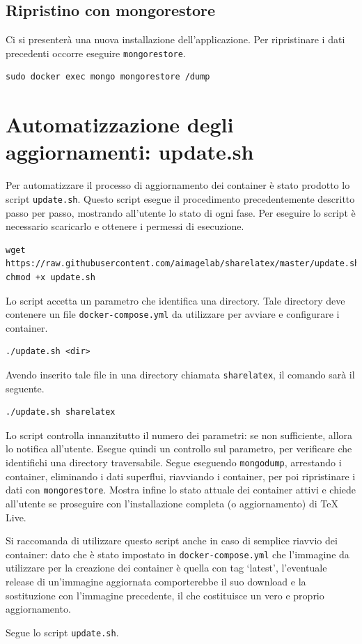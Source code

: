 \subsection{Ripristino con mongorestore}
Ci si presenterà una nuova installazione dell'applicazione. Per ripristinare i dati precedenti occorre eseguire \verb|mongorestore|.
\begin{lstlisting}
sudo docker exec mongo mongorestore /dump
\end{lstlisting}

\section{Automatizzazione degli aggiornamenti: update.sh}
Per automatizzare il processo di aggiornamento dei container è stato prodotto lo script \verb|update.sh|. Questo script esegue il procedimento precedentemente descritto passo per passo, mostrando all'utente lo stato di ogni fase. Per eseguire lo script è necessario scaricarlo e ottenere i permessi di esecuzione.
\begin{lstlisting}
wget https://raw.githubusercontent.com/aimagelab/sharelatex/master/update.sh
chmod +x update.sh
\end{lstlisting}
Lo script accetta un parametro che identifica una directory. Tale directory deve contenere un file \verb|docker-compose.yml| da utilizzare per avviare e configurare i container.
\begin{lstlisting}
./update.sh <dir>
\end{lstlisting}
Avendo inserito tale file in una directory chiamata \verb|sharelatex|, il comando sarà il seguente.
\begin{lstlisting}
./update.sh sharelatex
\end{lstlisting}
Lo script controlla innanzitutto il numero dei parametri: se non sufficiente, allora lo notifica all'utente. Esegue quindi un controllo sul parametro, per verificare che identifichi una directory traversabile. Segue eseguendo \verb|mongodump|, arrestando i container, eliminando i dati superflui, riavviando i container, per poi ripristinare i dati con \verb|mongorestore|. Mostra infine lo stato attuale dei container attivi e chiede all'utente se proseguire con l'installazione completa (o aggiornamento) di TeX Live.

Si raccomanda di utilizzare questo script anche in caso di semplice riavvio dei container: dato che è stato impostato in \verb|docker-compose.yml| che l'immagine da utilizzare per la creazione dei container è quella con tag \enquote*{latest}, l'eventuale release di un'immagine aggiornata comporterebbe il suo download e la sostituzione con l'immagine precedente, il che costituisce un vero e proprio aggiornamento.

Segue lo script \verb|update.sh|.
